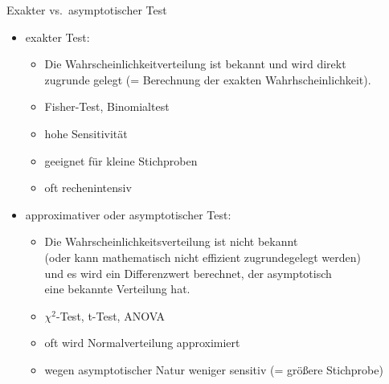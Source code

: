 \begin{frame}
  {Exakter vs.\ asymptotischer Test}
  \begin{itemize}
    \item \alert{exakter} Test: 
      \begin{itemize}
        \item Die Wahrscheinlichkeitverteilung ist bekannt und wird direkt\\
          zugrunde gelegt (= Berechnung der exakten Wahrhscheinlichkeit).
        \item Fisher-Test, Binomialtest
        \item hohe Sensitivität
        \item geeignet für kleine Stichproben
        \item oft rechenintensiv
      \end{itemize}
    \vspace{\baselineskip}
    \item \alert{approximativer} oder \alert{asymptotischer} Test: 
      \begin{itemize}
        \item Die Wahrscheinlichkeitsverteilung ist nicht bekannt\\
          (oder kann mathematisch nicht effizient zugrundegelegt werden)\\
          und es wird ein Differenzwert berechnet, der asymptotisch\\
          eine bekannte Verteilung hat.
        \item $\chi^2$-Test, t-Test, ANOVA
        \item oft wird Normalverteilung approximiert
        \item wegen asymptotischer Natur weniger sensitiv (= größere Stichprobe)
      \end{itemize}
  \end{itemize}
\end{frame}

